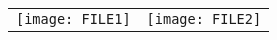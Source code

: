 \documentclass{article}
\begin{document}
\begin{figure}[!ht]
\begin{tabular}{ l r }
\texttt{[image: FILE1]} & \hspace{PADDINGpx} \texttt{[image: FILE2]}
\end{tabular}
\end{figure}
\end{document}
